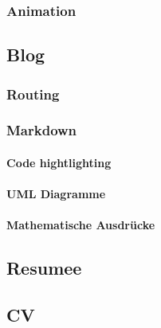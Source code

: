 \subsubsection{ Animation }
\subsection{ Blog } 
\subsubsection{ Routing }
\subsubsection{ Markdown }
\paragraph{ Code hightlighting }
\paragraph{ UML Diagramme}
\paragraph{ Mathematische Ausdrücke }
\subsection{ Resumee } 
\subsection{ CV } 


